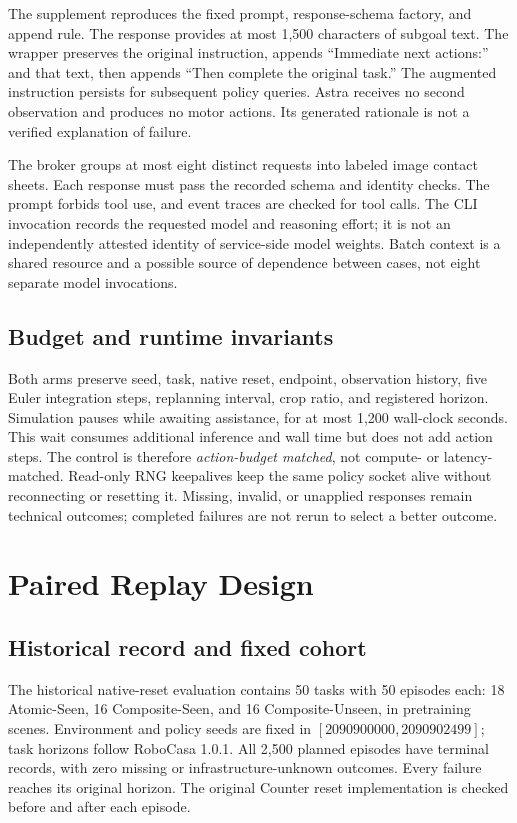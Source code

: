 \documentclass[10pt,twocolumn,letterpaper]{article}
\begin{document}
The supplement reproduces the fixed prompt, response-schema factory, and append rule. The response provides at most 1,500 characters of subgoal text. The wrapper preserves the original instruction, appends ``Immediate next actions:'' and that text, then appends ``Then complete the original task.'' The augmented instruction persists for subsequent policy queries. Astra receives no second observation and produces no motor actions. Its generated rationale is not a verified explanation of failure.

The broker groups at most eight distinct requests into labeled image contact sheets. Each response must pass the recorded schema and identity checks. The prompt forbids tool use, and event traces are checked for tool calls. The CLI invocation records the requested model and reasoning effort; it is not an independently attested identity of service-side model weights. Batch context is a shared resource and a possible source of dependence between cases, not eight separate model invocations.

\subsection{Budget and runtime invariants}
Both arms preserve seed, task, native reset, endpoint, observation history, five Euler integration steps, replanning interval, crop ratio, and registered horizon. Simulation pauses while awaiting assistance, for at most 1,200 wall-clock seconds. This wait consumes additional inference and wall time but does not add action steps. The control is therefore \emph{action-budget matched}, not compute- or latency-matched. Read-only RNG keepalives keep the same policy socket alive without reconnecting or resetting it. Missing, invalid, or unapplied responses remain technical outcomes; completed failures are not rerun to select a better outcome.

\section{Paired Replay Design}
\label{sec:design}
\subsection{Historical record and fixed cohort}
The historical native-reset evaluation contains 50 tasks with 50 episodes each: 18 Atomic-Seen, 16 Composite-Seen, and 16 Composite-Unseen, in pretraining scenes. Environment and policy seeds are fixed in $[2090900000,2090902499]$; task horizons follow RoboCasa 1.0.1. All 2,500 planned episodes have terminal records, with zero missing or infrastructure-unknown outcomes. Every failure reaches its original horizon. The original Counter reset implementation is checked before and after each episode.
\end{document}
